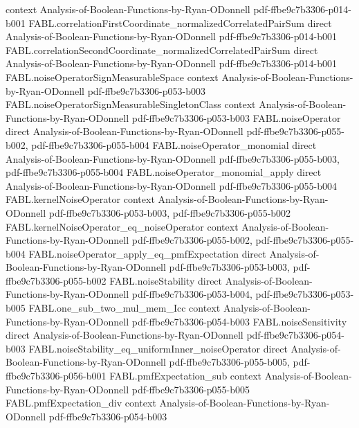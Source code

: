 \begin{theorem}
  {context}
  {Analysis-of-Boolean-Functions-by-Ryan-ODonnell}
  {pdf-ffbe9c7b3306-p014-b001}
\proofstep
  {FABL.correlationFirstCoordinate_normalizedCorrelatedPairSum}
  {direct}
  {Analysis-of-Boolean-Functions-by-Ryan-ODonnell}
  {pdf-ffbe9c7b3306-p014-b001}
\proofstep
  {FABL.correlationSecondCoordinate_normalizedCorrelatedPairSum}
  {direct}
  {Analysis-of-Boolean-Functions-by-Ryan-ODonnell}
  {pdf-ffbe9c7b3306-p014-b001}
\proofstep
  {FABL.noiseOperatorSignMeasurableSpace}
  {context}
  {Analysis-of-Boolean-Functions-by-Ryan-ODonnell}
  {pdf-ffbe9c7b3306-p053-b003}
\proofstep
  {FABL.noiseOperatorSignMeasurableSingletonClass}
  {context}
  {Analysis-of-Boolean-Functions-by-Ryan-ODonnell}
  {pdf-ffbe9c7b3306-p053-b003}
\proofstep
  {FABL.noiseOperator}
  {direct}
  {Analysis-of-Boolean-Functions-by-Ryan-ODonnell}
  {pdf-ffbe9c7b3306-p055-b002,
    pdf-ffbe9c7b3306-p055-b004}
\proofstep
  {FABL.noiseOperator_monomial}
  {direct}
  {Analysis-of-Boolean-Functions-by-Ryan-ODonnell}
  {pdf-ffbe9c7b3306-p055-b003,
    pdf-ffbe9c7b3306-p055-b004}
\proofstep
  {FABL.noiseOperator_monomial_apply}
  {direct}
  {Analysis-of-Boolean-Functions-by-Ryan-ODonnell}
  {pdf-ffbe9c7b3306-p055-b004}
\proofstep
  {FABL.kernelNoiseOperator}
  {context}
  {Analysis-of-Boolean-Functions-by-Ryan-ODonnell}
  {pdf-ffbe9c7b3306-p053-b003,
    pdf-ffbe9c7b3306-p055-b002}
\proofstep
  {FABL.kernelNoiseOperator_eq_noiseOperator}
  {context}
  {Analysis-of-Boolean-Functions-by-Ryan-ODonnell}
  {pdf-ffbe9c7b3306-p055-b002,
    pdf-ffbe9c7b3306-p055-b004}
\proofstep
  {FABL.noiseOperator_apply_eq_pmfExpectation}
  {direct}
  {Analysis-of-Boolean-Functions-by-Ryan-ODonnell}
  {pdf-ffbe9c7b3306-p053-b003,
    pdf-ffbe9c7b3306-p055-b002}
\proofstep
  {FABL.noiseStability}
  {direct}
  {Analysis-of-Boolean-Functions-by-Ryan-ODonnell}
  {pdf-ffbe9c7b3306-p053-b004,
    pdf-ffbe9c7b3306-p053-b005}
\proofstep
  {FABL.one_sub_two_mul_mem_Icc}
  {context}
  {Analysis-of-Boolean-Functions-by-Ryan-ODonnell}
  {pdf-ffbe9c7b3306-p054-b003}
\proofstep
  {FABL.noiseSensitivity}
  {direct}
  {Analysis-of-Boolean-Functions-by-Ryan-ODonnell}
  {pdf-ffbe9c7b3306-p054-b003}
\proofstep
  {FABL.noiseStability_eq_uniformInner_noiseOperator}
  {direct}
  {Analysis-of-Boolean-Functions-by-Ryan-ODonnell}
  {pdf-ffbe9c7b3306-p055-b005,
    pdf-ffbe9c7b3306-p056-b001}
\proofstep
  {FABL.pmfExpectation_sub}
  {context}
  {Analysis-of-Boolean-Functions-by-Ryan-ODonnell}
  {pdf-ffbe9c7b3306-p055-b005}
\proofstep
  {FABL.pmfExpectation_div}
  {context}
  {Analysis-of-Boolean-Functions-by-Ryan-ODonnell}
  {pdf-ffbe9c7b3306-p054-b003}

\end{theorem}
